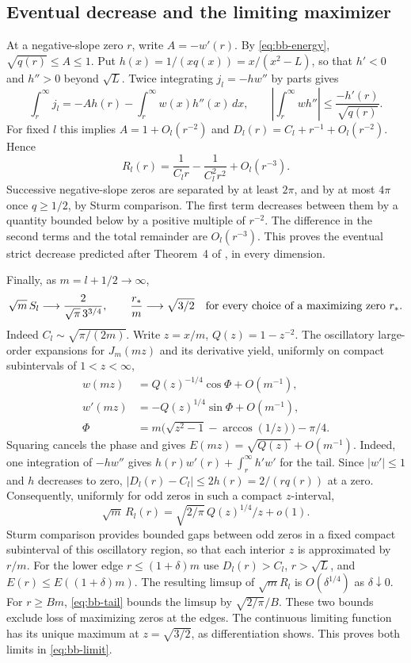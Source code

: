 \documentclass[11pt,a4paper]{article}
\theoremstyle{remark}\newtheorem{remark}[theorem]{Remark}
\numberwithin{equation}{section}
\begin{document}
\subsection{Eventual decrease and the limiting maximizer}
At a negative-slope zero $r$, write $A=-w'(r)$. By \eqref{eq:bb-energy},
$\sqrt{q(r)}\le A\le1$. Put $h(x)=1/(xq(x))=x/(x^2-L)$, so that
$h'<0$ and $h''>0$ beyond $\sqrt L$. Twice integrating
$j_l=-h w''$ by parts gives
\[
 \int_r^\infty j_l=-A h(r)-\int_r^\infty w(x)h''(x)\,dx,\qquad
 \left|\int_r^\infty w h''\right|\le\frac{-h'(r)}{\sqrt{q(r)}}.
\]
For fixed $l$ this implies $A=1+O_l(r^{-2})$ and
$D_l(r)=C_l+r^{-1}+O_l(r^{-2})$. Hence
\[
 R_l(r)=\frac{1}{C_l r}-\frac{1}{C_l^2 r^2}+O_l(r^{-3}).
\]
Successive negative-slope zeros are separated by at least $2\pi$,
and by at most $4\pi$ once $q\ge1/2$, by Sturm comparison.
The first term decreases between them by a quantity bounded below by
a positive multiple of $r^{-2}$. The difference in the second terms
and the total remainder are $O_l(r^{-3})$. This proves the eventual
strict decrease predicted after Theorem~4 of \cite{BB16}, in every dimension.

Finally, as $m=l+1/2\to\infty$,
\begin{equation}
 \sqrt m\, S_l\longrightarrow \frac{2}{\sqrt\pi\,3^{3/4}},
 \qquad \frac{r_*}{m}\longrightarrow\sqrt{3/2}
 \quad\hbox{for every choice of a maximizing zero }r_* .
 \label{eq:bb-limit}
\end{equation}
Indeed $C_l\sim\sqrt{\pi/(2m)}$. Write $z=x/m$, $Q(z)=1-z^{-2}$.
The oscillatory large-order expansions for $J_m(mz)$ and its derivative
\cite[Secs.~10.19(ii), 10.20(i)]{BBDLMF} yield, uniformly on compact
subintervals of $1<z<\infty$,
\[
\begin{aligned}
 w(mz)&=Q(z)^{-1/4}\cos\Phi+O(m^{-1}),\\
 w'(mz)&=-Q(z)^{1/4}\sin\Phi+O(m^{-1}),\\
 \Phi&=m\bigl(\sqrt{z^2-1}-\arccos(1/z)\bigr)-\pi/4 .
\end{aligned}
\]
Squaring cancels the phase and gives
$E(mz)=\sqrt{Q(z)}+O(m^{-1})$. Indeed, one integration of $-h w''$ gives $h(r)w'(r)+\int_r^\infty h'w'$ for the tail. Since $|w'|\le1$ and $h$ decreases to zero, $|D_l(r)-C_l|\le2h(r)=2/(rq(r))$ at a zero.
Consequently, uniformly for odd zeros in such a compact $z$-interval,
\[
 \sqrt m\,R_l(r)=\sqrt{2/\pi}\,Q(z)^{1/4}/z+o(1).
\]
Sturm comparison provides bounded gaps between odd zeros in a fixed
compact subinterval of this oscillatory region, so that each interior
$z$ is approximated by $r/m$. For the lower edge $r\le(1+\delta)m$ use
$D_l(r)>C_l$, $r>\sqrt L$, and $E(r)\le E((1+\delta)m)$. The resulting
limsup of $\sqrt m R_l$ is $O(\delta^{1/4})$ as $\delta\downarrow0$.
For $r\ge Bm$, \eqref{eq:bb-tail} bounds the limsup by
$\sqrt{2/\pi}/B$. These two bounds exclude loss of maximizing zeros at
the edges. The continuous limiting function has its unique maximum at
$z=\sqrt{3/2}$, as differentiation shows. This proves both limits in
\eqref{eq:bb-limit}.
\end{document}
